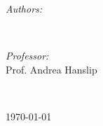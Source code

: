 \documentclass[12pt]{article}
\begin{document}
\begin{titlepage}
\begin{minipage}{0.4\textwidth}
\begin{flushleft} \large
\emph{Authors:}\\
\@author 
\end{flushleft}
\end{minipage}
~
\begin{minipage}{0.4\textwidth}
\begin{flushright} \large
\emph{Professor:} \\
Prof. Andrea Hanslip \\[1.2em] %

\end{flushright}
\end{minipage}\\[2cm]
\makeatother



{\large \today}\\[2cm] %

\vfill %

\end{titlepage}
\renewcommand{\abstractname}{Executive Summary}
\end{document}

